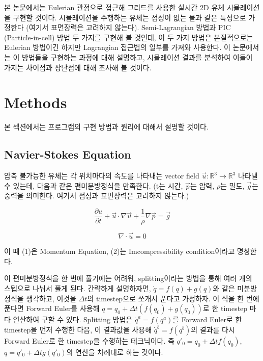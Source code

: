 \documentclass[12pt, A4]{article}
\begin{document}
본 논문에서는 Eulerian 관점으로 접근해 그리드를 사용한 실시간 2D 유체 시뮬레이션을 구현할 것이다. 시뮬레이션을 수행하는 유체는 점성이 없는 물과 같은 특성으로 가정한다 (여기서 표면장력은 고려하지 않는다). Semi-Lagrangian 방법과 PIC (Particle-in-cell) 방법 두 가지를 구현해 볼 것인데, 이 두 가지 방법은 본질적으로는 Eulerian 방법이긴 하지만 Lagrangian 접근법의 일부를 가져와 사용한다. 이 논문에서는 이 방법들을 구현하는 과정에 대해 설명하고, 시뮬레이션 결과를 분석하여 이들이 가지는 차이점과 장단점에 대해 조사해 볼 것이다.

\section{Methods}

본 섹션에서는 프로그램의 구현 방법과 원리에 대해서 설명할 것이다.

\subsection{Navier-Stokes Equation}

압축 불가능한 유체는 각 위치마다의 속도를 나타내는 vector field $\vec{u} : \mathbb{R}
^3 \rightarrow \mathbb{R}^3$ 나타낼 수 있는데, 다음과 같은 편미분방정식을 만족한다. (t는 시간, $\vec{p}$는 압력, $\rho$는 밀도, $\vec{g}$는 중력을 의미한다. 여기서 점성과 표면장력은 고려하지 않는다.)

\begin{equation}
  \frac{\partial u}{\partial t} + \vec{u} \cdot \nabla{\vec{u}} + \frac{1}{\rho} \nabla{\vec{p}} = \vec{g}
\end{equation}

\begin{equation}
  \nabla \cdot \vec{u} = 0
\end{equation}

이 때 (1)은 Momentum Equation, (2)는 Imcompressibility condition이라고 명칭한다. 

이 편미분방정식을 한 번에 풀기에는 어려워, splitting이라는 방법을 통해 여러 개의 스텝으로 나눠서 풀게 된다.
간략하게 설명하자면, $\dot q = f(q) + g(q)$와 같은 미분방정식을 생각하고, 이것을 $\Delta t$의 timestep으로 쪼개서 푼다고 가정하자.
이 식을 한 번에 푼다면 Forward Euler를 사용해 $q = q_0 + \Delta t (f(q_0) + g(q_0))$로 한 timestep 마다 연산하여 구할 수 있다.
Splitting 방법은 $\dot q^a = f(q^a)$를 Forward Euler로 한 timestep을 먼저 수행한 다음, 이 결과값을 사용해 $\dot q^b = f(q^b)$의 결과를 다시 Forward Euler로 한 timestep을 수행하는 테크닉이다. 즉 $q'_0 = q_0 + \Delta t f(q_0)$, $q = q'_0 + \Delta t g(q'_0)$의 연산을 차례대로 하는 것이다. \cite[p.17-19]{fluid-sim-cg}
\end{document}
